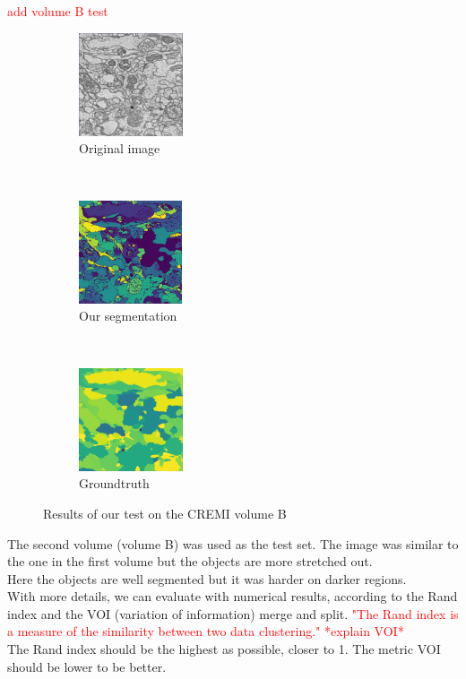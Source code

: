 \textcolor{red}{add volume B test}
\begin{figure}[t!]
    \centering
    \begin{subfigure}[t]{0.5\textwidth}
        \centering
        \includegraphics[height=1.2in]{./images/cremi_orig_2.png}
        \caption{Original image}
    \end{subfigure}%
    ~ 
    \begin{subfigure}[t]{0.5\textwidth}
        \centering
        \includegraphics[height=1.2in]{./images/cremi_out_2.png}
        \caption{Our segmentation}
    \end{subfigure}
    ~ 
    \begin{subfigure}[t]{0.5\textwidth}
        \centering
        \includegraphics[height=1.2in]{./images/cremi_gt_2.png}
        \caption{Groundtruth}
    \end{subfigure}
    \caption{Results of our test on the CREMI volume B}
\end{figure}

The second volume (volume B) was used as the test set.
The image was similar to the one in the first volume but the objects are more stretched out.\\
Here the objects are well segmented but it was harder on darker regions.\\

With more details, we can evaluate with numerical results, according to the Rand index and the VOI (variation of information) merge and split. 
\textcolor{red}{"The Rand index is a measure of the similarity between two data clustering."
*explain VOI*\\}
The Rand index should be the highest as possible, closer to 1. 
The metric VOI should be lower to be better.\\

